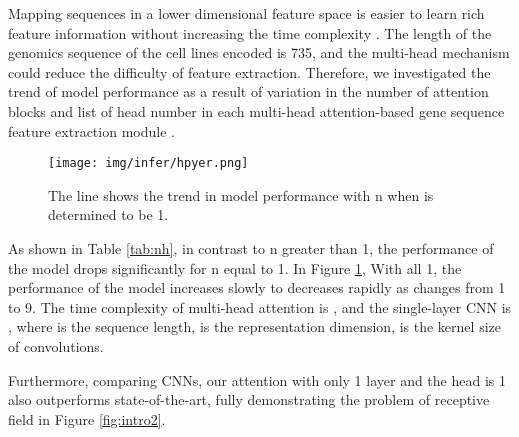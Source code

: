 \documentclass{article}
\begin{document}
Mapping sequences in a lower dimensional feature space is easier to learn rich feature information without increasing the time complexity \cite{attention}. The length of the genomics sequence of the cell lines encoded is 735, and the multi-head mechanism could reduce the difficulty of feature extraction. Therefore, we investigated the trend of model performance as a result of variation in the number of attention blocks  and list of head number in each multi-head attention-based gene sequence feature extraction module .



\begin{table}[htbp]
\caption{We show the model evaluation metrics Pearson at different variations of n and h  h when n is determined from 1 to 5.}
\centering
\renewcommand\arraystretch{1.2}

\label{tab:nh}
\end{table}


\begin{figure}[htbp]
	\centering
    \texttt{[image: img/infer/hpyer.png]}\label{fig:3b}
	
	\caption{The line shows the trend in model performance with n when  is determined to be 1.
	}
	\label{fig:SAH}
\end{figure}

As shown in Table \ref{tab:nh}, in contrast to n greater than 1, the performance of the model drops significantly for n equal to 1. In Figure \ref{fig:SAH}, With  all 1,  the performance of the model increases slowly to decreases rapidly as  changes from 1 to 9.
The time complexity of multi-head attention is , and the single-layer CNN is , where  is the sequence length,  is the representation dimension,  is the kernel size of convolutions.

Furthermore, comparing CNNs, our attention with only 1 layer and the head is 1 also outperforms state-of-the-art, fully demonstrating the problem of receptive field in Figure \ref{fig:intro2}.
\end{document}
